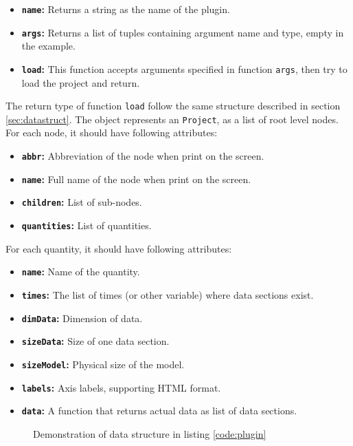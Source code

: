 \begin{itemize}[noitemsep,nolistsep]
	\item \textbf{\texttt{name}:} Returns a string as the name of the plugin.
	\item \textbf{\texttt{args}:} Returns a list of tuples containing argument name and type, empty in the example.
	\item \textbf{\texttt{load}:} This function accepts arguments specified in function \texttt{args}, then try to load the project and return.
\end{itemize}

The return type of function \texttt{load} follow the same structure described in section \ref{sec:datastruct}. The object represents an \texttt{Project}, as a list of root level nodes. For each node, it should have following attributes:

\begin{itemize}[noitemsep,nolistsep]
	\item \textbf{\texttt{abbr}:} Abbreviation of the node when print on the screen.
	\item \textbf{\texttt{name}:} Full name of the node when print on the screen.
	\item \textbf{\texttt{children}:} List of sub-nodes.
	\item \textbf{\texttt{quantities}:} List of quantities.
\end{itemize}

For each quantity, it should have following attributes:

\begin{itemize}[noitemsep,nolistsep]
	\item \textbf{\texttt{name}:} Name of the quantity.
	\item \textbf{\texttt{times}:} The list of times (or other variable) where data sections exist.
	\item \textbf{\texttt{dimData}:} Dimension of data.
	\item \textbf{\texttt{sizeData}:} Size of one data section.
	\item \textbf{\texttt{sizeModel}:} Physical size of the model.
	\item \textbf{\texttt{labels}:} Axis labels, supporting HTML format.
	\item \textbf{\texttt{data}:} A function that returns actual data as list of data sections.
\end{itemize}

\begin{figure}[!htb]
	\vspace{-1em}
	\centering
	 \hspace{2em}

	\caption{Demonstration of data structure in listing \ref{code:plugin}}
	\label{fig:example}
\end{figure}

